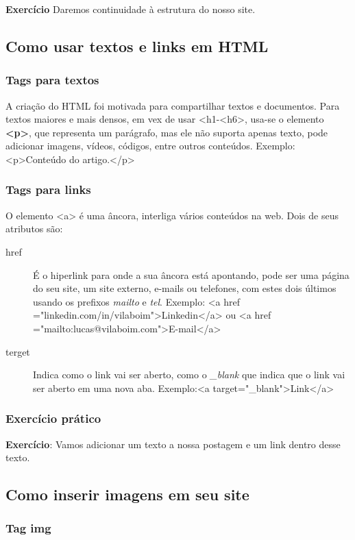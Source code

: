 \documentclass[12pt,a4paper]{article}
\begin{document}
	\textbf{Exercício} Daremos continuidade à estrutura do nosso site.
	
	\subsection{Como usar textos e links em HTML}
	\subsubsection{Tags para textos}
	
	A criação do HTML foi motivada para compartilhar textos e documentos. Para textos maiores e mais densos, em vex de usar <h1-<h6>, usa-se o elemento \textbf{<p>}, que representa um parágrafo, mas ele não suporta apenas texto, pode adicionar imagens, vídeos, códigos, entre outros conteúdos. Exemplo:<p>Conteúdo do artigo.</p>
	
	\subsubsection{Tags para links}
	
	O elemento <a> é uma âncora, interliga vários conteúdos na web. Dois de seus atributos são:
	\begin{description}
		\item[href] É o hiperlink para onde a sua âncora está apontando, pode ser uma página do seu site, um site externo, e-mails ou telefones, com estes dois últimos usando os prefixos \textit{mailto} e \textit{tel}. Exemplo: <a href ="linkedin.com/in/vilaboim">Linkedin</a> ou <a href ="mailto:lucas@vilaboim.com">E-mail</a>
		\item[terget] Indica como o link vai ser aberto, como o \textit{\_blank} que indica que o link vai ser aberto em uma nova aba. Exemplo:<a target="\_blank">Link</a>
	\end{description} 
	
	\subsubsection{Exercício prático}
	
	\textbf{Exercício}: Vamos adicionar um texto a nossa postagem e um link dentro desse texto.
	
	\subsection{Como inserir imagens em seu site}
	\subsubsection{Tag img}
	
\end{document}
